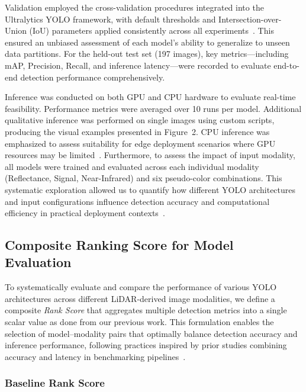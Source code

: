\documentclass[runningheads]{llncs}
\begin{document}
Validation employed the cross-validation procedures integrated into the Ultralytics YOLO framework, with default thresholds and Intersection-over-Union (IoU) parameters applied consistently across all experiments~\cite{bishop2006pattern}. This ensured an unbiased assessment of each model’s ability to generalize to unseen data partitions. For the held-out test set (197 images), key metrics—including mAP, Precision, Recall, and inference latency—were recorded to evaluate end-to-end detection performance comprehensively. 

Inference was conducted on both GPU and CPU hardware to evaluate real-time feasibility. Performance metrics were averaged over 10 runs per model. Additional qualitative inference was performed on single images using custom scripts, producing the visual examples presented in Figure~2. CPU inference was emphasized to assess suitability for edge deployment scenarios where GPU resources may be limited~\cite{lane2016deepx}. Furthermore, to assess the impact of input modality, all models were trained and evaluated across each individual modality (Reflectance, Signal, Near-Infrared) and six pseudo-color combinations. This systematic exploration allowed us to quantify how different YOLO architectures and input configurations influence detection accuracy and computational efficiency in practical deployment contexts~\cite{zhang2016color}.



\subsection{Composite Ranking Score for Model Evaluation}
\label{Ranking_Score}

To systematically evaluate and compare the performance of various YOLO architectures across different LiDAR-derived image modalities, we define a composite \textit{Rank Score} that aggregates multiple detection metrics into a single scalar value as done from our previous work. This formulation enables the selection of model--modality pairs that optimally balance detection accuracy and inference performance, following practices inspired by prior studies combining accuracy and latency in benchmarking pipelines~\cite{bochkovskiy2020yolov4,lin2014microsoft,tan2020efficientdet}. 



\subsubsection{Baseline Rank Score}
\end{document}
